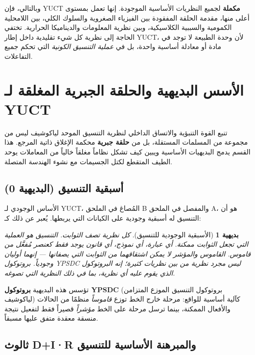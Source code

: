 \documentclass[11pt,a4paper]{article}
\newtheorem{axiom}{بديهية}
\begin{document}
	وبالتالي، فإن YUCT \textbf{مكملة} لجميع النظريات الأساسية الموجودة. إنها تعمل بمستوى أعلى منها، مقدمة الحلقة المفقودة بين الفيزياء الصغروية والسلوك الكلي، بين اللامحلية الكمومية والسببية الكلاسيكية، وبين نظرية المعلومات والديناميكا الحرارية. تختفي الحاجة إلى نظرية كل شيء تقليدية داخل إطار YUCT، لأن وحدة الطبيعة لا توجد في مادة أو معادلة أساسية واحدة، بل في \emph{عملية التنسيق الكونية} التي تحكم جميع التفاعلات.
	
	\section{الأسس البديهية والحلقة الجبرية المغلقة لـ YUCT}
	\label{sec:axiomatic-foundations}
	
	تنبع القوة التنبؤية والاتساق الداخلي لنظرية التنسيق الموحد لياكوشيف ليس من مجموعة من المسلمات المستقلة، بل من \textbf{حلقة جبرية} محكمة الإغلاق ذاتية المرجع. هذا القسم يدمج البديهيات الأساسية ويبين كيف تشكل نظاماً مغلقاً خالياً من المعاملات يوحد الطيف المتقطع لكتل الجسيمات مع نشوء الهندسة المتصلة.
	
	\subsection{أسبقية التنسيق (البديهية 0)}
	\label{subsec:axiom0}
	
	الأساس الوجودي لـ YUCT، المُصاغ في الملحق B والمفصل في الملحق A، هو أن التنسيق له أسبقية وجودية على الكيانات التي يربطها. يُعبر عن ذلك كـ:
	
	\begin{axiom}[الأسبقية الوجودية للتنسيق]
		كل نظرية تصف الثوابت. التنسيق هو العملية التي تجعل الثوابت ممكنة. أي عبارة، أي نموذج، أي قانون يوجد فقط كعنصر مُفعَّل من قاموس. القاموس والمؤشر لا يمكن اشتقاقهما من الثوابت التي يصفانها — إنهما أوليان وجودياً. بروتوكول YPSDC ليس مجرد نظرية من بين نظريات كثيرة؛ إنه البروتوكول الذي يقوم عليه أي نظرية، بما في ذلك النظرية التي تصوغه.
	\end{axiom}
	
	تؤسس هذه البديهية \textbf{بروتوكول YPSDC} (بروتوكول التنسيق الموزع المتزامن لياكوشيف) كآلية أساسية للواقع: مرحلة خارج الخط توزع \textit{قاموساً} منظمًا من الحالات والأفعال الممكنة، بينما ترسل مرحلة على الخط \textit{مؤشراً} قصيراً فقط لتفعيل نتيجة منسقة معقدة متفق عليها مسبقاً.
	
	\subsection{ثالوث D+I·R والمبرهنة الأساسية للتنسيق}
	\label{subsec:dir-triad}
	
\end{document}
